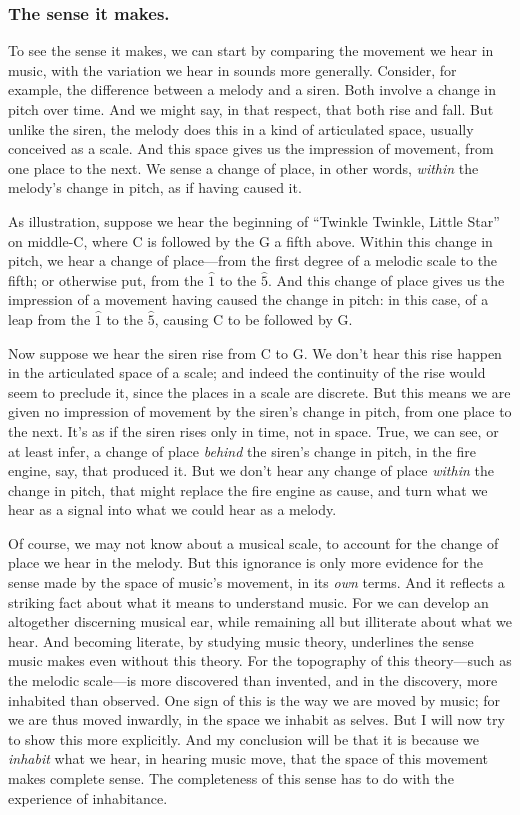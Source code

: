 \documentclass[12pt]{memoir}
\begin{document}
\subsubsection{The sense it makes.}

To see the sense it makes, we can start by
comparing the movement we hear in music, with
the variation we hear in sounds more generally.
Consider, for example, the difference between a
melody and a siren. Both involve a change in pitch
over time. And we might say, in that respect, that
both rise and fall. But unlike the siren, the
melody does this in a kind of articulated space,
usually conceived as a scale. And this space gives
us the impression of movement, from one place to
the next. We sense a change of place, in other
words, \emph{within} the melody's change in pitch,
as if having caused it.

As illustration, suppose we hear the beginning
of ``Twinkle Twinkle, Little Star'' on middle-C,
where C is followed by the G a fifth above.
Within this change in pitch, we hear a change of
place---from the first degree of a melodic scale
to the fifth; or otherwise put, from the $\hat{1}$
to the $\hat{5}$. And this change of place gives
us the impression of a movement having caused the
change in pitch: in this case, of a leap from
the $\hat{1}$ to the $\hat{5}$, causing C to be
followed by G.

Now suppose we hear the siren rise from C to G. We
don't hear this rise happen in the articulated
space of a scale; and indeed the continuity of the
rise would seem to preclude it, since the places
in a scale are discrete. But this means we are
given no impression of movement by the siren's
change in pitch, from one place to the next. It's
as if the siren rises only in time, not in space.
True, we can see, or at least infer, a change of
place \emph{behind} the siren's change in pitch,
in the fire engine, say, that produced it. But we
don't hear any change of place \emph{within} the
change in pitch, that might replace the fire
engine as cause, and turn what we hear as a signal
into what we could hear as a melody.

Of course, we may not know about a musical scale,
to account for the change of place we hear in
the melody. But this ignorance is only more
evidence for the sense made by the space of
music's movement, in its \emph{own} terms. And it
reflects a striking fact about what it means to
understand music. For we can develop an altogether
discerning musical ear, while remaining all but
illiterate about what we hear. And becoming
literate, by studying music theory, underlines
the sense music makes even without this theory.
For the topography of this theory---such as
the melodic scale---is more discovered than
invented, and in the discovery, more inhabited
than observed. One sign of this is the way we are
moved by music; for we are thus moved inwardly,
in the space we inhabit as selves. But I will
now try to show this more explicitly. And my
conclusion will be that it is because we 
\emph{inhabit} what we hear, in hearing music
move, that the space of this movement makes
complete sense. The completeness of this sense has
to do with the experience of inhabitance.
\end{document}
